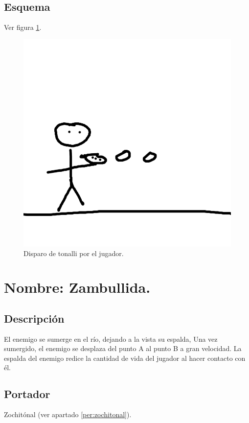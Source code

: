 \subsection{Esquema}
			Ver figura \ref{fig:disparoT}.
			\begin{figure}
				\centering
				\includegraphics[height=0.2 \textheight]{Imagenes/disparoT}
				\caption{Disparo de tonalli por el jugador.}
				\label{fig:disparoT}
			\end{figure}
			
\section{Nombre: Zambullida.}\label{hab.zambullida}
\subsection{Descripción}
El enemigo se sumerge en el río, dejando a la vista su espalda, Una vez sumergido, el enemigo se desplaza del punto A al punto B a gran velocidad. La espalda del enemigo redice la cantidad de vida del jugador al hacer contacto con él.  
\subsection{Portador}
Zochitónal (ver apartado \ref{per:zochitonal}).
